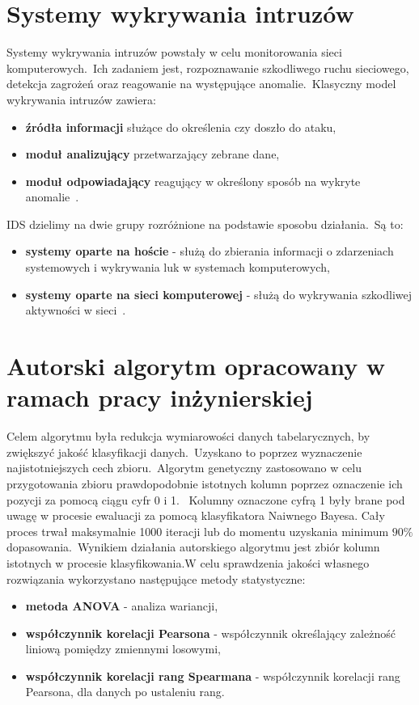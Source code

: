 \section{Systemy wykrywania intruzów}
Systemy wykrywania intruzów  powstały w celu monitorowania sieci komputerowych.\ Ich zadaniem jest, rozpoznawanie szkodliwego ruchu sieciowego, detekcja zagrożeń oraz reagowanie na występujące anomalie.\ Klasyczny model wykrywania intruzów zawiera:
\begin{itemize}
\item \textbf{źródła informacji} służące do określenia czy doszło do ataku,
\item \textbf{moduł analizujący} przetwarzający zebrane dane,
\item \textbf{moduł odpowiadający} reagujący w określony sposób na wykryte anomalie~\cite{SazzadulHoque2012, Bacer, Blyszcz2022}.
\end{itemize}
IDS dzielimy na dwie grupy rozróżnione na podstawie sposobu działania.\ Są to:
\begin{itemize}
    \item \textbf{systemy oparte na hoście}  - służą do zbierania informacji o zdarzeniach systemowych i wykrywania luk w systemach komputerowych,
    \item \textbf{systemy oparte na sieci komputerowej}  - służą do wykrywania szkodliwej aktywności w sieci~\cite{Blyszcz2022, SazzadulHoque2012, chawlaashima}.
\end{itemize}

\section{Autorski algorytm opracowany w ramach pracy inżynierskiej}
Celem algorytmu była redukcja wymiarowości danych tabelarycznych, by zwiększyć jakość klasyfikacji danych.\ Uzyskano to poprzez wyznaczenie najistotniejszych cech zbioru.\ Algorytm genetyczny zastosowano w celu przygotowania zbioru prawdopodobnie istotnych kolumn poprzez oznaczenie ich pozycji za pomocą ciągu cyfr 0 i 1.  \ Kolumny oznaczone cyfrą 1 były brane pod uwagę w procesie ewaluacji za pomocą klasyfikatora Naiwnego Bayesa. Cały proces trwał maksymalnie 1000 iteracji lub do momentu uzyskania minimum $90\%$ dopasowania.\ Wynikiem działania autorskiego algorytmu jest zbiór kolumn istotnych w procesie klasyfikowania.W celu sprawdzenia jakości  własnego rozwiązania wykorzystano następujące metody statystyczne:
\begin{itemize}
    \item \textbf{metoda ANOVA} - analiza wariancji,
    \item \textbf{współczynnik korelacji Pearsona} - współczynnik określający zależność liniową pomiędzy zmiennymi losowymi,
    \item \textbf{współczynnik korelacji rang Spearmana} - współczynnik korelacji rang Pearsona, dla danych po ustaleniu rang.
\end{itemize}


